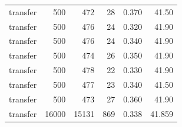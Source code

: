 \begin{table}[ht]
\begin{tabular}{lrrrrr}
transfer & 500 & 472 & 28 & 0.370 & 41.50 \\
transfer & 500 & 476 & 24 & 0.320 & 41.90 \\
transfer & 500 & 476 & 24 & 0.340 & 41.90 \\
transfer & 500 & 474 & 26 & 0.350 & 41.90 \\
transfer & 500 & 478 & 22 & 0.330 & 41.90 \\
transfer & 500 & 477 & 23 & 0.340 & 41.50 \\
transfer & 500 & 473 & 27 & 0.360 & 41.90 \\
transfer & 16000 & 15131 & 869 & 0.338 & 41.859 \\
\midrule
\bottomrule
\end{tabular}
\end{table}
